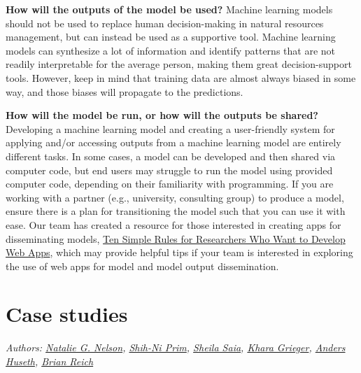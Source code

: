 \documentclass[
]{book}
\begin{document}
\textbf{How will the outputs of the model be used?}
Machine learning models should not be used to replace human decision-making in natural resources management, but can instead be used as a supportive tool. Machine learning models can synthesize a lot of information and identify patterns that are not readily interpretable for the average person, making them great decision-support tools. However, keep in mind that training data are almost always biased in some way, and those biases will propagate to the predictions.

\textbf{How will the model be run, or how will the outputs be shared?}
Developing a machine learning model and creating a user-friendly system for applying and/or accessing outputs from a machine learning model are entirely different tasks. In some cases, a model can be developed and then shared via computer code, but end users may struggle to run the model using provided computer code, depending on their familiarity with programming. If you are working with a partner (e.g., university, consulting group) to produce a model, ensure there is a plan for transitioning the model such that you can use it with ease. Our team has created a resource for those interested in creating apps for disseminating models, \href{https://journals.plos.org/ploscompbiol/article?id=10.1371/journal.pcbi.1009663}{Ten Simple Rules for Researchers Who Want to Develop Web Apps}, which may provide helpful tips if your team is interested in exploring the use of web apps for model and model output dissemination.

\hypertarget{case-studies}{%
\chapter{Case studies}\label{case-studies}}

\emph{Authors: \href{https://bae.ncsu.edu/people/nnelson4/}{Natalie G. Nelson}, \href{https://www.linkedin.com/in/shih-ni-prim-14033336/}{Shih-Ni Prim}, \href{https://sheilasaia.rbind.io/}{Sheila Saia}, \href{https://cals.ncsu.edu/applied-ecology/people/kdgriege/}{Khara Grieger}, \href{https://cals.ncsu.edu/entomology-and-plant-pathology/people/ashuseth/}{Anders Huseth}, \href{https://statistics.sciences.ncsu.edu/people/bjreich/}{Brian Reich}}
\end{document}

